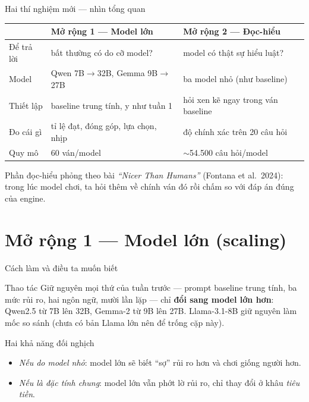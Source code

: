 \documentclass[aspectratio=169,11pt]{beamer}
\begin{document}
\begin{frame}{Hai thí nghiệm mới --- nhìn tổng quan}
  \begin{center}\small
  \begin{tabular}{lll}
    \toprule
    & \textbf{Mở rộng 1 --- Model lớn} & \textbf{Mở rộng 2 --- Đọc-hiểu} \\
    \midrule
    Để trả lời  & bất thường có do cỡ model? & model có thật sự hiểu luật? \\
    Model       & Qwen 7B$\to$32B, Gemma 9B$\to$27B & ba model nhỏ (như baseline) \\
    Thiết lập   & baseline trung tính, y như tuần 1 & hỏi xen kẽ ngay trong ván baseline \\
    Đo cái gì   & tỉ lệ đạt, đóng góp, lựa chọn, nhịp & độ chính xác trên 20 câu hỏi \\
    Quy mô      & 60 ván/model & $\sim$54.500 câu hỏi/model \\
    \bottomrule
  \end{tabular}
  \end{center}
  \vfill
  {\footnotesize Phần đọc-hiểu phỏng theo bài \emph{``Nicer Than Humans''} (Fontana et al.\ 2024): trong lúc model chơi, ta hỏi thêm về chính ván đó rồi chấm so với đáp án đúng của engine.}
\end{frame}

\section{Mở rộng 1 --- Model lớn (scaling)}

\begin{frame}{Cách làm và điều ta muốn biết}
  \begin{block}{Thao tác}
    {\footnotesize Giữ nguyên mọi thứ của tuần trước --- prompt baseline trung tính, ba mức rủi ro, hai ngôn ngữ, mười lần lặp --- chỉ \textbf{đổi sang model lớn hơn}: Qwen2.5 từ 7B lên 32B, Gemma-2 từ 9B lên 27B. Llama-3.1-8B giữ nguyên làm mốc so sánh (chưa có bản Llama lớn nên để trống cặp này).}
  \end{block}
  \begin{exampleblock}{Hai khả năng đối nghịch}
    \begin{itemize}
      \item \emph{Nếu do model nhỏ}: model lớn sẽ biết ``sợ'' rủi ro hơn và chơi giống người hơn.
      \item \emph{Nếu là đặc tính chung}: model lớn vẫn phớt lờ rủi ro, chỉ thay đổi ở khâu \emph{tiêu tiền}.
    \end{itemize}
  \end{exampleblock}
\end{frame}
\end{document}
